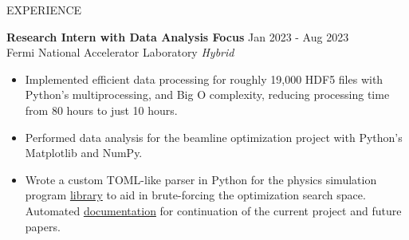 \begin{rSection}{EXPERIENCE} 

\textbf{Research Intern with Data Analysis Focus} \hfill Jan 2023 - Aug 2023 \\
Fermi National Accelerator Laboratory \hfill \textit{Hybrid}
 \begin{itemize}
    \item Implemented efficient data processing for roughly 19,000 HDF5 files with Python's multiprocessing, and Big O complexity, reducing processing time from 80 hours to just 10 hours.
    \item Performed data analysis for the beamline optimization project with Python's Matplotlib and NumPy. 
    \item Wrote a custom TOML-like parser in Python for the physics simulation program \href{https://github.com/badumbatish/fermi_proj}{library} to aid in brute-forcing the optimization search space. Automated \href{https://badumbatish.github.io/fermi_proj/}{documentation} for continuation of the current project and future papers.
 \end{itemize}
 
 
\end{rSection} 